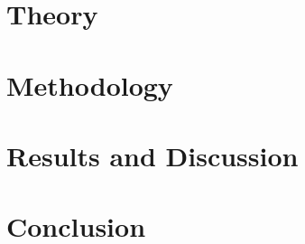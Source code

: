 \documentclass[%
a4paper,							
11pt,								
bibliography=totoc,						
abstracton=true					
]
{scrartcl}
\theoremstyle{plain}
\theoremstyle{definition}
\theoremstyle{remark}
\newcommand{\1}{\mathbbm{1}}
\begin{document}
\section{Theory}\label{sec:theory}




\section{Methodology}\label{sec:Method}



\section{Results and Discussion}\label{sec:Results}



\section{Conclusion}\label{sec:Conclusion}


\newpage
\appendix

\printbibliography




\newpage
\end{document}
